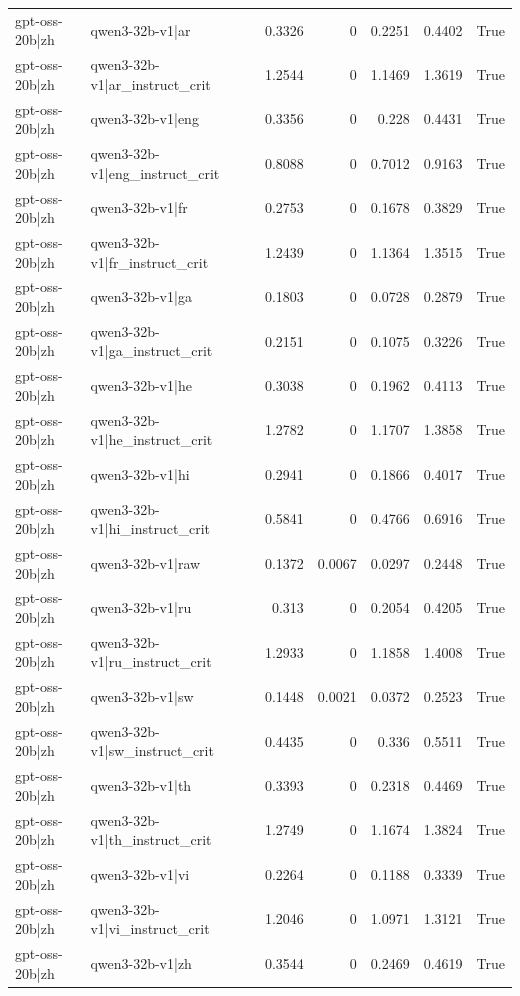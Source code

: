 \begin{table}
\begin{tabular}{l l r r r r l}
gpt-oss-20b|zh & qwen3-32b-v1|ar & 0.3326 & 0 & 0.2251 & 0.4402 & True \\
gpt-oss-20b|zh & qwen3-32b-v1|ar_instruct_crit & 1.2544 & 0 & 1.1469 & 1.3619 & True \\
gpt-oss-20b|zh & qwen3-32b-v1|eng & 0.3356 & 0 & 0.228 & 0.4431 & True \\
gpt-oss-20b|zh & qwen3-32b-v1|eng_instruct_crit & 0.8088 & 0 & 0.7012 & 0.9163 & True \\
gpt-oss-20b|zh & qwen3-32b-v1|fr & 0.2753 & 0 & 0.1678 & 0.3829 & True \\
gpt-oss-20b|zh & qwen3-32b-v1|fr_instruct_crit & 1.2439 & 0 & 1.1364 & 1.3515 & True \\
gpt-oss-20b|zh & qwen3-32b-v1|ga & 0.1803 & 0 & 0.0728 & 0.2879 & True \\
gpt-oss-20b|zh & qwen3-32b-v1|ga_instruct_crit & 0.2151 & 0 & 0.1075 & 0.3226 & True \\
gpt-oss-20b|zh & qwen3-32b-v1|he & 0.3038 & 0 & 0.1962 & 0.4113 & True \\
gpt-oss-20b|zh & qwen3-32b-v1|he_instruct_crit & 1.2782 & 0 & 1.1707 & 1.3858 & True \\
gpt-oss-20b|zh & qwen3-32b-v1|hi & 0.2941 & 0 & 0.1866 & 0.4017 & True \\
gpt-oss-20b|zh & qwen3-32b-v1|hi_instruct_crit & 0.5841 & 0 & 0.4766 & 0.6916 & True \\
gpt-oss-20b|zh & qwen3-32b-v1|raw & 0.1372 & 0.0067 & 0.0297 & 0.2448 & True \\
gpt-oss-20b|zh & qwen3-32b-v1|ru & 0.313 & 0 & 0.2054 & 0.4205 & True \\
gpt-oss-20b|zh & qwen3-32b-v1|ru_instruct_crit & 1.2933 & 0 & 1.1858 & 1.4008 & True \\
gpt-oss-20b|zh & qwen3-32b-v1|sw & 0.1448 & 0.0021 & 0.0372 & 0.2523 & True \\
gpt-oss-20b|zh & qwen3-32b-v1|sw_instruct_crit & 0.4435 & 0 & 0.336 & 0.5511 & True \\
gpt-oss-20b|zh & qwen3-32b-v1|th & 0.3393 & 0 & 0.2318 & 0.4469 & True \\
gpt-oss-20b|zh & qwen3-32b-v1|th_instruct_crit & 1.2749 & 0 & 1.1674 & 1.3824 & True \\
gpt-oss-20b|zh & qwen3-32b-v1|vi & 0.2264 & 0 & 0.1188 & 0.3339 & True \\
gpt-oss-20b|zh & qwen3-32b-v1|vi_instruct_crit & 1.2046 & 0 & 1.0971 & 1.3121 & True \\
gpt-oss-20b|zh & qwen3-32b-v1|zh & 0.3544 & 0 & 0.2469 & 0.4619 & True \\

\end{tabular}
\end{table}
